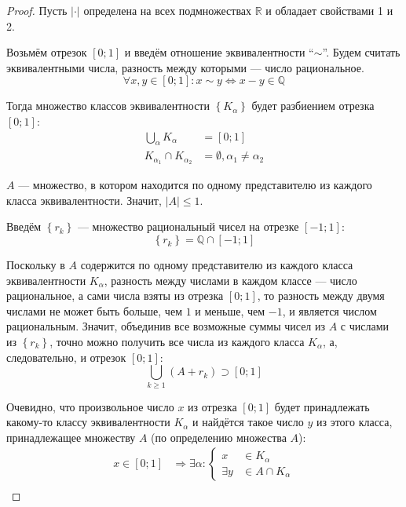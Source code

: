 \begin{proof}
    Пусть $\left|\cdot\right|$ определена на всех подмножествах $\mathbb{R}$ и
    обладает свойствами 1 и 2.

    Возьмём отрезок $\left[0;1\right]$ и введём
    отношение эквивалентности ``$\sim$''.
    Будем считать эквивалентными числа,
    разность между которыми --- число рациональное.
    $$\forall x,y\in\left[0;1\right]: x\sim y
    \Leftrightarrow x-y\in\mathbb{Q}$$

    Тогда множество классов эквивалентности $\left\{K_{\alpha}\right\}$
    будет разбиением отрезка $\left[0;1\right]$:
    \begin{align*}
        \bigcup_{\alpha} K_{\alpha}&=\left[0;1\right]\\
        K_{\alpha_1} \cap K_{\alpha_2}&=\emptyset,\alpha_1\neq\alpha_2
    \end{align*}

    $A$ --- множество, в котором находится по одному представителю
    из каждого класса эквивалентности. Значит, $\left|A\right|\le 1$.

    Введём $\left\{r_k\right\}$ --- множество рациональный чисел
    на отрезке $\left[-1;1\right]$:
    $$\left\{r_k\right\}=\mathbb{Q} \cap \left[-1;1\right]$$

    Поскольку в $A$ содержится по одному представителю
    из каждого класса эквивалентности $K_{\alpha}$,
    разность между числами в каждом классе --- число рациональное,
    а сами числа взяты из отрезка $\left[0;1\right]$,
    то разность между двумя числами не может быть
    больше, чем $1$ и меньше, чем $-1$, и является числом рациональным.
    Значит, объединив все возможные суммы
    чисел из $A$ с числами из $\left\{r_k\right\}$,
    точно можно получить все числа из каждого класса $K_{\alpha}$,
    а, следовательно, и отрезок $\left[0;1\right]$:
    $$\bigcup_{k\ge 1} \left(A+r_k\right) \supset \left[0;1\right]$$

    Очевидно, что произвольное число $x$ из отрезка $\left[0;1\right]$
    будет принадлежать какому-то классу эквивалентности $K_{\alpha}$ и
    найдётся такое число $y$ из этого класса,
    принадлежащее множеству $A$ (по определению множества $A$):
    \begin{equation*}
        \begin{aligned}
            x\in\left[0;1\right] &\Rightarrow \exists\alpha: \left\{
            \begin{aligned}
                 x&\in K_{\alpha}\\
                 \exists y&\in A\cap K_{\alpha}
            \end{aligned}\right.\\
        \end{aligned}
    \end{equation*}


\end{proof}
